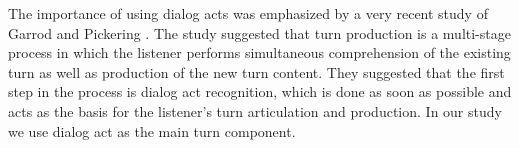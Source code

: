 The importance of using dialog acts was emphasized by a very recent study of Garrod and Pickering \cite{garrod2015use}. The study suggested that turn production is a multi-stage process in which the listener performs simultaneous comprehension of the existing turn as well as production of the new turn content. They suggested that the first step in the process is dialog act recognition, which is done as soon as possible and acts as the basis for the listener's turn articulation and production. In our study we use dialog act as the main turn component.
